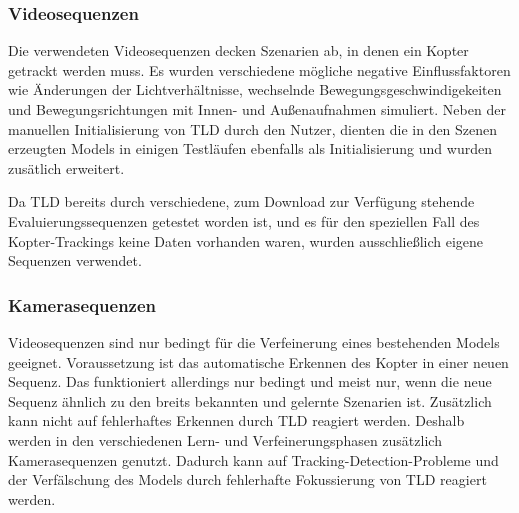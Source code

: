\subsubsection{Videosequenzen}
Die verwendeten Videosequenzen decken Szenarien ab, in denen ein Kopter getrackt werden muss. Es wurden verschiedene mögliche negative Einflussfaktoren wie Änderungen der Lichtverhältnisse, wechselnde Bewegungsgeschwindigekeiten und Bewegungsrichtungen mit Innen- und Außenaufnahmen simuliert. Neben der manuellen Initialisierung von TLD durch den Nutzer, dienten die in den Szenen erzeugten Models in einigen Testläufen ebenfalls als Initialisierung und wurden zusätlich erweitert.

Da TLD bereits durch verschiedene, zum Download zur Verfügung stehende Evaluierungssequenzen getestet worden ist, und es für den speziellen Fall des Kopter-Trackings keine Daten vorhanden waren, wurden ausschließlich eigene Sequenzen verwendet.

\subsubsection{Kamerasequenzen}
Videosequenzen sind nur bedingt für die Verfeinerung eines bestehenden Models geeignet. Voraussetzung ist das automatische Erkennen des Kopter in einer neuen Sequenz. Das funktioniert allerdings nur bedingt und meist nur, wenn die neue Sequenz ähnlich zu den breits bekannten und gelernte Szenarien ist. Zusätzlich kann nicht auf fehlerhaftes Erkennen durch TLD reagiert werden. Deshalb werden in den verschiedenen Lern- und Verfeinerungsphasen zusätzlich Kamerasequenzen genutzt. Dadurch kann auf Tracking-Detection-Probleme und der Verfälschung des Models durch fehlerhafte Fokussierung von TLD reagiert werden.